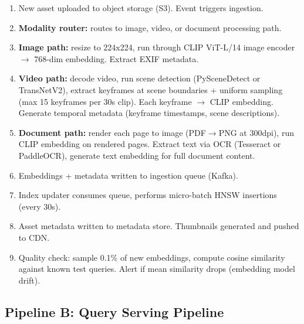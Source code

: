 \begin{enumerate}
  \item New asset uploaded to object storage (S3). Event triggers ingestion.
  \item \textbf{Modality router:} routes to image, video, or document processing path.
  \item \textbf{Image path:} resize to 224x224, run through CLIP ViT-L/14 image encoder $\rightarrow$ 768-dim embedding. Extract EXIF metadata.
  \item \textbf{Video path:} decode video, run scene detection (PySceneDetect or TransNetV2), extract keyframes at scene boundaries + uniform sampling (max 15 keyframes per 30s clip). Each keyframe $\rightarrow$ CLIP embedding. Generate temporal metadata (keyframe timestamps, scene descriptions).
  \item \textbf{Document path:} render each page to image (PDF$\rightarrow$PNG at 300dpi), run CLIP embedding on rendered pages. Extract text via OCR (Tesseract or PaddleOCR), generate text embedding for full document content.
  \item Embeddings + metadata written to ingestion queue (Kafka).
  \item Index updater consumes queue, performs micro-batch HNSW insertions (every 30s).
  \item Asset metadata written to metadata store. Thumbnails generated and pushed to CDN.
  \item Quality check: sample 0.1\% of new embeddings, compute cosine similarity against known test queries. Alert if mean similarity drops (embedding model drift).
\end{enumerate}

\subsection*{Pipeline B: Query Serving Pipeline}

